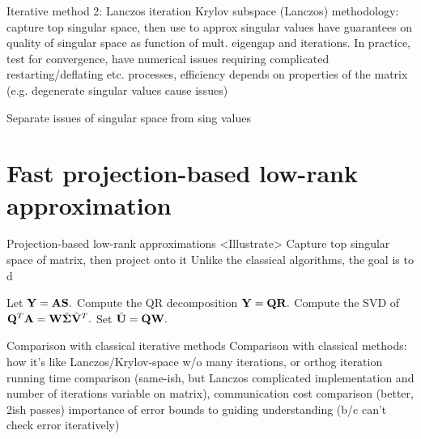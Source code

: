 \documentclass[xcolor={svgnames,pdftex,dvipsnames,table},10pt]{beamer} %
\begin{document}
\begin{frame}{Iterative method 2: Lanczos iteration}
 Krylov subspace (Lanczos)
 methodology: capture top singular space, then use to approx singular values
 have guarantees on quality of singular space as function of mult. eigengap
 and iterations. 
 In practice, test for convergence, have numerical issues requiring
 complicated restarting/deflating etc. processes, efficiency depends on
 properties of the matrix (e.g. degenerate singular values cause issues)
 
 Separate issues of singular space from sing values
\end{frame}

\section{Fast projection-based low-rank approximation}
\begin{frame}{Projection-based low-rank approximations}
 <Illustrate>
 Capture top singular space of matrix, then project onto it
 Unlike the classical algorithms, the goal is to d
\end{frame}

\begin{frame}
 \algrenewcommand{}
 \algrenewcommand{}
 \begin{algorithmic}[1]
  \Statex
  
 \State Let $\mathbf{Y} = \mathbf{A} \mathbf{S}.$
 \State Compute the QR decomposition $\mathbf{Y} = \mathbf{Q} \mathbf{R}.$
 \State Compute the SVD of $\mathbf{Q}^T \mathbf{A} = \mathbf{W} \tilde{\boldsymbol{\Sigma}} \tilde{\mathbf{V}}^T.$
 \State Set $\tilde{\mathbf{U}} = \mathbf{Q} \mathbf{W}.$
\end{algorithmic}
\end{frame}

\begin{frame}{Comparison with classical iterative methods}
 Comparison with classical methods:
 how it's like Lanczos/Krylov-space w/o many iterations, or orthog iteration
 running time comparison (same-ish, but Lanczos complicated implementation 
 and number of iterations variable on matrix), communication cost comparison (better, 2ish passes)
 importance of error bounds to guiding understanding (b/c can't check error iteratively)
\end{frame}
\end{document}
